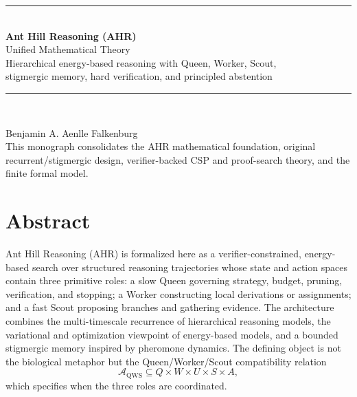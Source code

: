 \documentclass[11pt,oneside]{book}
\theoremstyle{remark}
\newcommand{\AQWS}{\mathcal A_{\mathrm{QWS}}}
\begin{document}
\frontmatter

\hypersetup{pageanchor=false}
\begin{titlepage}
\centering
\vspace*{20mm}
{\color{AHRBlue}\rule{0.82\textwidth}{1.2pt}}\\[11mm]
{\Huge\bfseries Ant Hill Reasoning (AHR)\\[4mm]}
{\LARGE Unified Mathematical Theory\\[8mm]}
{\large Hierarchical energy-based reasoning with Queen, Worker, Scout,\\
stigmergic memory, hard verification, and principled abstention}
\\[14mm]
{\color{AHRBlue}\rule{0.82\textwidth}{1.2pt}}\\[18mm]


\vfill
{\Large Benjamin A. Aenlle Falkenburg}\\[13mm]
{\small This monograph consolidates the AHR mathematical foundation, original recurrent/stigmergic design, verifier-backed CSP and proof-search theory, and the finite formal model.}
\end{titlepage}
\hypersetup{pageanchor=true}
\setcounter{page}{1}

\chapter*{Abstract}

Ant Hill Reasoning (AHR) is formalized here as a verifier-constrained, energy-based search over structured reasoning trajectories whose state and action spaces contain three primitive roles: a slow Queen governing strategy, budget, pruning, verification, and stopping; a Worker constructing local derivations or assignments; and a fast Scout proposing branches and gathering evidence. The architecture combines the multi-timescale recurrence of hierarchical reasoning models, the variational and optimization viewpoint of energy-based models, and a bounded stigmergic memory inspired by pheromone dynamics. The defining object is not the biological metaphor but the Queen/Worker/Scout compatibility relation
\[
\AQWS\subseteq Q\times W\times U\times S\times A,
\]
which specifies when the three roles are coordinated.
\end{document}
